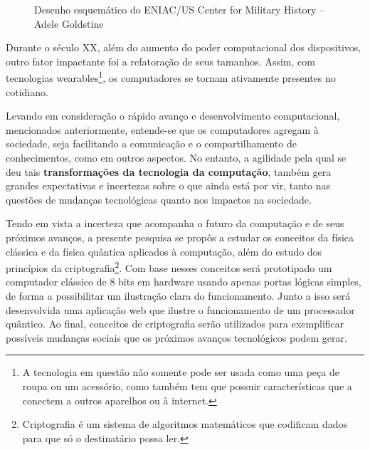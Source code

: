 \vspace{1cm}
\begin{figure}[H] \centering 
  \caption{\label{fig:1} Desenho esquemático do ENIAC/US Center for Military History –
  Adele Goldstine} 
\end{figure}


Durante o século XX, além do aumento do poder computacional dos dispositivos, outro fator impactante foi a refatoração de seus tamanhos. Assim, com tecnologias wearables\footnote{A tecnologia em questão não somente pode ser usada como uma peça de roupa ou um acessório, como também tem que possuir características que a conectem a outros aparelhos ou à internet.}, os computadores se tornam ativamente presentes no cotidiano.

Levando em consideração o rápido avanço e desenvolvimento computacional, mencionados anteriormente, entende-se que os computadores agregam à sociedade, seja facilitando a comunicação e o compartilhamento de conhecimentos, como em outros aspectos. No entanto, a agilidade pela qual se deu tais \textbf{transformações da tecnologia da computação}, também gera grandes expectativas e incertezas sobre o que ainda está por vir, tanto nas questões de mudanças tecnológicas quanto nos impactos na sociedade.

Tendo em vista a incerteza que acompanha o futuro da computação e de seus próximos avanços, a presente pesquisa se propôs a estudar os conceitos da física clássica e da física quântica aplicados à computação, além do estudo dos princípios da criptografia\footnote{Criptografia é um sistema de algoritmos matemáticos que codificam dados para que só o destinatário possa ler.}. Com base nesses conceitos será prototipado um computador clássico de 8 bits em hardware usando apenas portas lógicas simples, de forma a possibilitar um ilustração clara do funcionamento. Junto a isso será desenvolvida uma aplicação web que ilustre o funcionamento de um processador quântico. Ao final, conceitos de criptografia serão utilizados para exemplificar possíveis mudanças sociais que os próximos avanços tecnológicos podem gerar.

